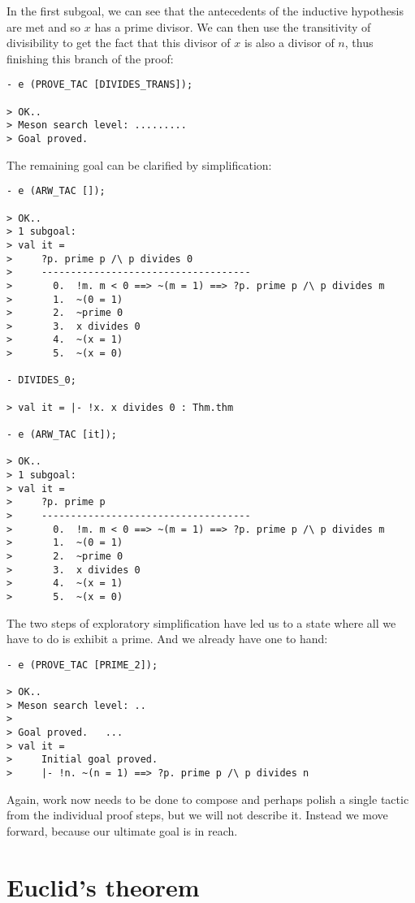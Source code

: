 In the first subgoal, we can see that the antecedents of the inductive
hypothesis are met and so $x$ has a prime divisor. We can then use the
transitivity of divisibility to get the fact that this divisor of $x$ is
also a divisor of $n$, thus finishing this branch of the proof:
\begin{session}\begin{verbatim}
- e (PROVE_TAC [DIVIDES_TRANS]);

> OK..
> Meson search level: .........
> Goal proved.
\end{verbatim}\end{session}
\noindent The remaining goal can be clarified by simplification:
\begin{session}\begin{verbatim}
- e (ARW_TAC []);

> OK..
> 1 subgoal:
> val it =
>     ?p. prime p /\ p divides 0
>     ------------------------------------
>       0.  !m. m < 0 ==> ~(m = 1) ==> ?p. prime p /\ p divides m
>       1.  ~(0 = 1)
>       2.  ~prime 0
>       3.  x divides 0
>       4.  ~(x = 1)
>       5.  ~(x = 0)

- DIVIDES_0;

> val it = |- !x. x divides 0 : Thm.thm

- e (ARW_TAC [it]);

> OK..
> 1 subgoal:
> val it =
>     ?p. prime p
>     ------------------------------------
>       0.  !m. m < 0 ==> ~(m = 1) ==> ?p. prime p /\ p divides m
>       1.  ~(0 = 1)
>       2.  ~prime 0
>       3.  x divides 0
>       4.  ~(x = 1)
>       5.  ~(x = 0)
\end{verbatim}\end{session}
The two steps of exploratory simplification have led us to a state where
all we have to do is exhibit a prime. And we already have one to hand:
\begin{session}\begin{verbatim}
- e (PROVE_TAC [PRIME_2]);

> OK..
> Meson search level: ..
>
> Goal proved.   ...
> val it =
>     Initial goal proved.
>     |- !n. ~(n = 1) ==> ?p. prime p /\ p divides n
\end{verbatim}\end{session}
Again, work now needs to be done to compose and perhaps polish a single
tactic from the individual proof steps, but we will not describe
it. Instead we move forward, because our ultimate goal is in reach.

\section{Euclid's theorem}

